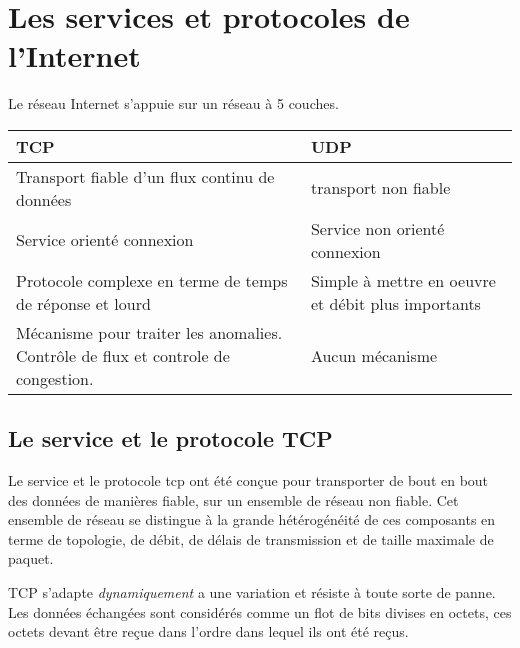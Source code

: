 \documentclass[12pt,a4paper,openany]{book}
\begin{document}
	\chapter{Les services et protocoles de l'Internet}
	Le réseau Internet s'appuie sur un réseau à 5 couches. 

	\begin{tabular}{p{8cm}|p{8cm}}
		\textbf{TCP} & \textbf{UDP}\\
		\hline
		Transport fiable d'un flux continu de données & transport non fiable\\
		\hline
		Service orienté connexion & Service non orienté connexion \\
		\hline
		Protocole complexe en terme de temps de réponse et lourd & Simple à mettre en oeuvre et débit plus importants\\
		\hline
		Mécanisme pour traiter les anomalies. Contrôle de flux et controle de congestion.& Aucun mécanisme\\
	\end{tabular}
	
	\section{Le service et le protocole TCP}
	Le service et le protocole tcp ont été conçue pour transporter de bout en bout des données de manières fiable, sur un ensemble de réseau non
	fiable. Cet ensemble de réseau se distingue à la grande hétérogénéité de ces composants en terme de topologie, de débit, de délais de transmission
	et de taille maximale de paquet.

	TCP s'adapte \textit{dynamiquement} a une variation et résiste à toute sorte de panne. Les données échangées sont considérés comme un flot de bits divises en
	octets, ces octets devant être reçue dans l'ordre dans lequel ils ont été reçus.
\end{document}
